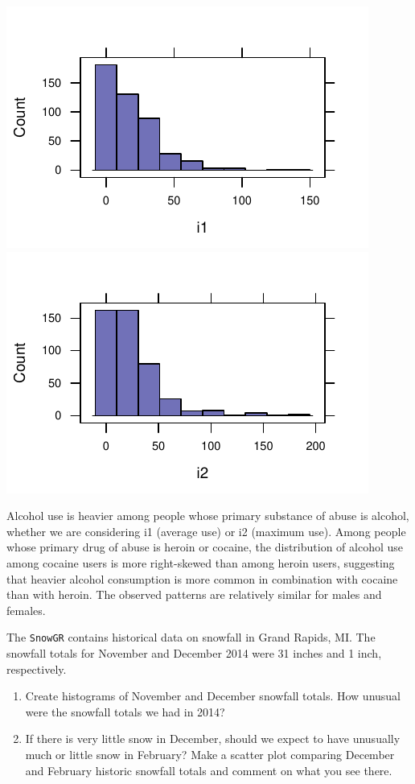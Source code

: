 \documentclass[twoside]{book}\usepackage[]{graphicx}\usepackage[]{xcolor}
\makeatletter
\def\maxwidth{ %
  \ifdim\Gin@nat@width>\linewidth
    \linewidth
  \else
    \Gin@nat@width
  \fi
}
\newenvironment{knitrout}{}{} %
\newcommand{\Rindex}[1]{\index{\texttt{#1}}}
\newcommand{\dataframe}[1]{{\color{blue!80!black}\texttt{#1}}\Rindex{#1}}
\makeatother
\begin{document}
\begin{solution}
\begin{knitrout}
{\centering \includegraphics[width=\maxwidth]{figures/fig-unnamed-chunk-34-1} 
\includegraphics[width=\maxwidth]{figures/fig-unnamed-chunk-34-2} 

}



\end{knitrout}
Alcohol use is heavier among people whose primary substance of abuse is alcohol, whether we are considering i1 (average use) or i2 (maximum use). Among people whose primary drug of abuse is heroin or cocaine, the distribution of alcohol use among cocaine users is more right-skewed than among heroin users, suggesting that heavier alcohol consumption is more common in combination with cocaine than with heroin.  The observed patterns are relatively similar for males and females.
\end{solution}

\begin{problem}
	The \dataframe{SnowGR} contains historical data on snowfall in Grand Rapids, MI.
	The snowfall totals for November and December 2014 were 31 inches and 1 inch, respectively.
	\begin{enumerate}
		\item
			Create histograms of November and December snowfall totals.  How unusual were the snowfall totals we had in 2014?
		\item
			If there is very little snow in December, should we expect to have unusually much
			or little snow in February?  Make a scatter plot comparing December and February
			historic snowfall totals and comment on what you see there.
	\end{enumerate}
\end{problem}
\end{document}
